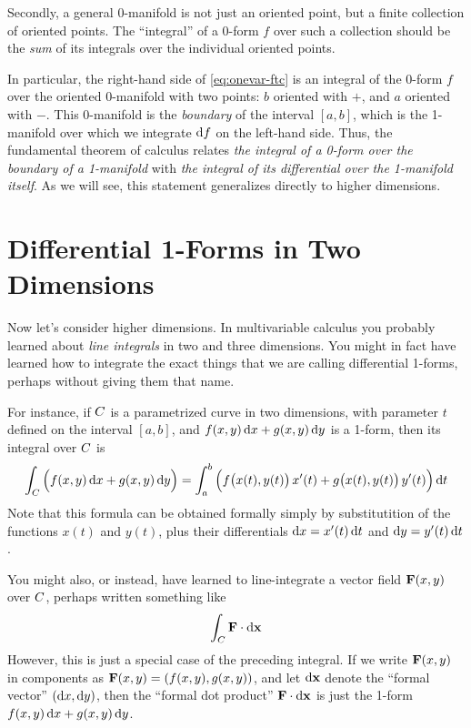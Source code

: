 \documentclass[12pt]{amsart}
\begin{document}
Secondly, a general $0$-manifold is not just an oriented point, but a finite collection of oriented points.
The ``integral'' of a 0-form $f$ over such a collection should be the \emph{sum} of its integrals over the individual oriented points.

In particular, the right-hand side of \cref{eq:onevar-ftc} is an integral of the 0-form $f$ over the oriented $0$-manifold with two points: $b$ oriented with $+$, and $a$ oriented with $-$.
This 0-manifold is the \emph{boundary} of the interval $[a,b]$, which is the 1-manifold over which we integrate ${\mathrm{d} f}$ on the left-hand side.
Thus, the fundamental theorem of calculus relates \emph{the integral of a 0-form over the boundary of a 1-manifold} with \emph{the integral of its differential over the 1-manifold itself}.
As we will see, this statement generalizes directly to higher dimensions.


\section{Differential 1-Forms in Two Dimensions}
\label{sec:1forms-in-2D}

Now let's consider higher dimensions.
In multivariable calculus you probably learned about \emph{line integrals} in two and three dimensions.
You might in fact have learned how to integrate the exact things that we are calling differential 1-forms, perhaps without giving them that name.

For instance, if $C$ is a parametrized curve in two dimensions, with parameter $t$ defined on the interval $[a,b]$, and $f(x,y)\,{\mathrm{d} x} + g(x,y)\,{\mathrm{d} y}$ is a 1-form, then its integral over $C$ is
\[ \int_{C} \Big(f(x,y)\,{\mathrm{d} x} + g(x,y)\,{\mathrm{d} y}\Big) = \int_a^b \Big( f\big(x(t),y(t)\big)\, x'(t) + g\big(x(t),y(t)\big)\,y'(t)\Big) \,{\mathrm{d} t} \]
Note that this formula can be obtained formally simply by substitutition of the functions $x(t)$ and $y(t)$, plus their differentials ${\mathrm{d} x} = x'(t)\,{\mathrm{d} t}$ and ${\mathrm{d} y} = y'(t)\,{\mathrm{d} t}$.

You might also, or instead, have learned to line-integrate a vector field $\mathbf{F}(x,y)$ over $C$, perhaps written something like
\[ \int_{C} \mathbf{F} \cdot {\ensuremath{\mathrm{d} \mathbf{x}}} \]
However, this is just a special case of the preceding integral.
If we write $\mathbf{F}(x,y)$ in components as $\mathbf{F}(x,y) = (f(x,y),g(x,y))$, and let ${\mathrm{d} \mathbf{x}}$ denote the ``formal vector'' $({\mathrm{d} x},{\mathrm{d} y})$, then the ``formal dot product'' $\mathbf{F} \cdot {\ensuremath{\mathrm{d} \mathbf{x}}}$ is just the 1-form $f(x,y)\,{\mathrm{d} x} + g(x,y)\,{\mathrm{d} y}$.
\end{document}
